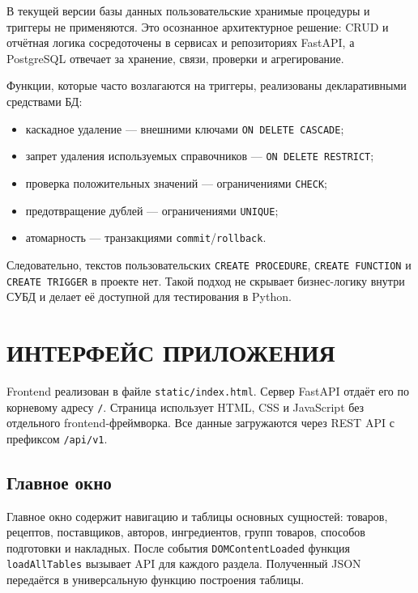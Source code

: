 \documentclass[14pt,a4paper]{extarticle}
\begin{document}
В текущей версии базы данных пользовательские хранимые процедуры и триггеры
не применяются. Это осознанное архитектурное решение: CRUD и отчётная логика
сосредоточены в сервисах и репозиториях FastAPI, а PostgreSQL отвечает за
хранение, связи, проверки и агрегирование.

Функции, которые часто возлагаются на триггеры, реализованы декларативными
средствами БД:

\begin{itemize}[leftmargin=1.25cm]
    \item каскадное удаление --- внешними ключами \texttt{ON DELETE CASCADE};
    \item запрет удаления используемых справочников --- \texttt{ON DELETE RESTRICT};
    \item проверка положительных значений --- ограничениями \texttt{CHECK};
    \item предотвращение дублей --- ограничениями \texttt{UNIQUE};
    \item атомарность --- транзакциями \texttt{commit}/\texttt{rollback}.
\end{itemize}

Следовательно, текстов пользовательских \texttt{CREATE PROCEDURE},
\texttt{CREATE FUNCTION} и \texttt{CREATE TRIGGER} в проекте нет. Такой подход
не скрывает бизнес-логику внутри СУБД и делает её доступной для тестирования в
Python.

\clearpage
\section{ИНТЕРФЕЙС ПРИЛОЖЕНИЯ}

Frontend реализован в файле \texttt{static/index.html}. Сервер FastAPI отдаёт
его по корневому адресу \texttt{/}. Страница использует HTML, CSS и JavaScript
без отдельного frontend-фреймворка. Все данные загружаются через REST API с
префиксом \texttt{/api/v1}.

\subsection{Главное окно}

Главное окно содержит навигацию и таблицы основных сущностей: товаров,
рецептов, поставщиков, авторов, ингредиентов, групп товаров, способов
подготовки и накладных. После события \texttt{DOMContentLoaded} функция
\texttt{loadAllTables} вызывает API для каждого раздела. Полученный JSON
передаётся в универсальную функцию построения таблицы.
\end{document}
